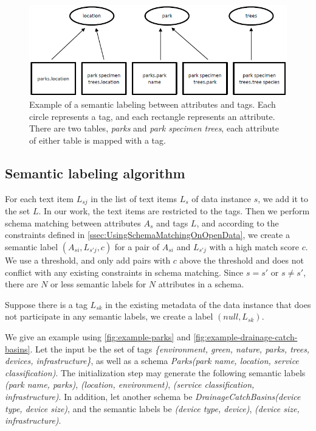 \begin{figure}
    \centering
    \includegraphics[width=5in]{figures/example-semantic-labeling.png}
    \caption{Example of a semantic labeling between attributes and tags.
    Each circle represents a tag, and each rectangle represents an attribute. There are two tables, \textit{parks} and \textit{park specimen trees}, each attribute of either table is mapped with a tag.}
    \label{fig:example-semantic-labeling}
\end{figure}

\subsection{Semantic labeling algorithm}
\label{ssec:SemanticLabelingAlgorithm}

For each text item $L_{sj}$ in the list of text items $L_{s}$ of data instance $s$, we add it to the set $L$. In our work, the text items are restricted to the tags. Then we perform schema matching between attributes $A_{s}$ and tags $L$, and according to the constraints defined in \autoref{ssec:UsingSchemaMatchingOnOpenData}, we create a semantic label $(A_{si},L_{s'j},c)$ for a pair of $A_{si}$ and $L_{s'j}$ with a high match score $c$. We use a threshold, and only add pairs with $c$ above the threshold and does not conflict with any existing constraints in schema matching. Since $s=s'$ or $s\neq s'$, there are $N$ or less semantic labels for $N$ attributes in a schema.

Suppose there is a tag $L_{sk}$ in the existing metadata of the data instance that does not participate in any semantic labels, we create a label $(null,L_{sk})$.

We give an example using \autoref{fig:example-parks} and \autoref{fig:example-drainage-catch-basins}. Let the input be the set of tags \textit{\{environment, green, nature, parks, trees, devices, infrastructure\}}, as well as a schema \textit{Parks(park name, location, service classification)}. The initialization step may generate the following semantic labels \textit{(park name, parks)}, \textit{(location, environment)}, \textit{(service classification, infrastructure)}. In addition, let another schema be \textit{DrainageCatchBasins(device type, device size)}, and the semantic labels be \textit{(device type, device)}, \textit{(device size, infrastructure)}.

